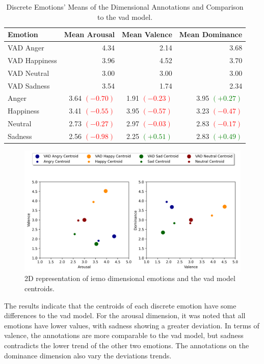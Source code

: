 \begin{table}[H]
	\centering
	\caption{Discrete Emotions' Means of the Dimensional Annotations and Comparison to the \ac{vad} model.}
	\label{tab:dis_dim}
	\begin{tabular}{lrrr}
		\toprule
		Emotion & Mean Arousal &   Mean Valence & Mean Dominance \\
		\midrule
		VAD Anger     & 4.34 & 2.14 & 3.68 \\
		VAD Happiness & 3.96 & 4.52 & 3.70 \\
		VAD Neutral   & 3.00 & 3.00 & 3.00 \\
		VAD Sadness   & 3.54 & 1.74 & 2.34 \\
		\addlinespace
		Anger   	&   3.64 \textcolor{red}{$(-0.70)$} &  1.91 \textcolor{red}{$(-0.23)$} &  3.95 \textcolor{green}{$(+0.27)$} \\
		Happiness   &   3.41 \textcolor{red}{$(-0.55)$} &  3.95 \textcolor{red}{$(-0.57)$} &  3.23 \textcolor{red}{$(-0.47)$} \\
		Neutral 	&   2.73 \textcolor{red}{$(-0.27)$} &  2.97 \textcolor{red}{$(-0.03)$} &  2.83 \textcolor{red}{$(-0.17)$} \\
		Sadness     &   2.56 \textcolor{red}{$(-0.98)$} &  2.25 \textcolor{green}{$(+0.51)$} &  2.83 \textcolor{green}{$(+0.49)$} \\
		\bottomrule
	\end{tabular}
\end{table}


\begin{figure}[H]
  \centeringS
  \includegraphics[width=.9\linewidth]{figs/5_data_stratification/primitives_visualization_2d.png}
  \caption{2D representation of \ac{iemo} dimensional emotions and the \ac{vad} model centroids.}
  \label{fig:2dplane}
\end{figure}

The results indicate that the centroids of each discrete emotion have some differences to the \ac{vad} model. For the arousal dimension, it was noted that all emotions have lower values, with sadness showing a greater deviation. In terms of valence, the annotations are more comparable to the \ac{vad} model, but sadness contradicts the lower trend of the other two emotions. The annotations on the dominance dimension also vary the deviations trends.

